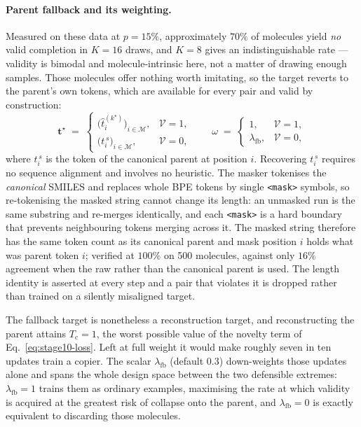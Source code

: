 \paragraph{Parent fallback and its weighting.}
Measured on these data at $p=15\%$, approximately $70\%$ of molecules yield
\emph{no} valid completion in $K=16$ draws, and $K=8$ gives an
indistinguishable rate --- validity is bimodal and molecule-intrinsic here, not
a matter of drawing enough samples. Those molecules offer nothing worth
imitating, so the target reverts to the parent's own tokens, which are
available for every pair and valid by construction:
\begin{equation}
\mathbf{t}^{\star} \;=\;
\begin{cases}
\bigl(\hat{t}^{(k^{\star})}_i\bigr)_{i \in \mathcal{M}}, & \mathcal{V}=1,\\[1ex]
\bigl(t^{\,s}_i\bigr)_{i \in \mathcal{M}}, & \mathcal{V}=0,
\end{cases}
\qquad
\omega \;=\;
\begin{cases}
1, & \mathcal{V}=1,\\[1ex]
\lambda_{\mathrm{fb}}, & \mathcal{V}=0,
\end{cases}
\label{eq:stage10-target}
\end{equation}
where $t^{\,s}_i$ is the token of the canonical parent at position $i$.
Recovering $t^{\,s}_i$ requires no sequence alignment and involves no
heuristic. The masker tokenises the \emph{canonical} SMILES and replaces whole
BPE tokens by single \texttt{<mask>} symbols, so re-tokenising the masked
string cannot change its length: an unmasked run is the same substring and
re-merges identically, and each \texttt{<mask>} is a hard boundary that
prevents neighbouring tokens merging across it. The masked string therefore has
the same token count as its canonical parent and mask position $i$ holds what
was parent token $i$; verified at $100\%$ on 500 molecules, against only $16\%$
agreement when the raw rather than the canonical parent is used. The length
identity is asserted at every step and a pair that violates it is dropped
rather than trained on a silently misaligned target.

The fallback target is nonetheless a reconstruction target, and reconstructing
the parent attains $T_{\mathrm{c}}=1$, the worst possible value of the novelty
term of Eq.~\eqref{eq:stage10-loss}. Left at full weight it would make roughly
seven in ten updates train a copier. The scalar $\lambda_{\mathrm{fb}}$
(default $0.3$) down-weights those updates alone and spans the whole design
space between the two defensible extremes: $\lambda_{\mathrm{fb}}=1$ trains
them as ordinary examples, maximising the rate at which validity is acquired at
the greatest risk of collapse onto the parent, and $\lambda_{\mathrm{fb}}=0$ is
exactly equivalent to discarding those molecules.

